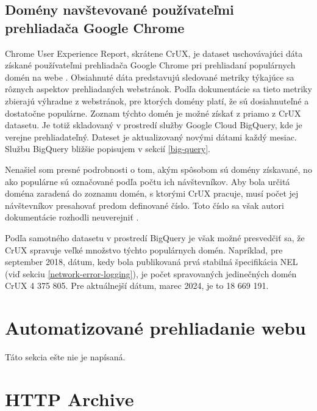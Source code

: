 \subsection{Domény navštevované používateľmi prehliadača Google Chrome}
\label{chrome-user-experience-report}

Chrome User Experience Report, skrátene CrUX, je dataset uschovávajúci dáta získané používateľmi prehliadača Google Chrome pri prehliadaní populárnych domén na webe \cite{chrome-crux}.
Obsiahnuté dáta predstavujú sledované metriky týkajúce sa rôznych aspektov prehliadaných webstránok.
Podľa dokumentácie sa tieto metriky zbierajú výhradne z webstránok, pre ktorých domény platí, že sú dosiahnuteľné a dostatočne populárne.
Zoznam týchto domén je možné získať z priamo z CrUX datasetu.
Je totiž skladovaný v prostredí služby Google Cloud BigQuery, kde je verejne prehliadateľný. 
Dateset je aktualizovaný novými dátami každý mesiac.
Službu BigQuery bližšie popisujem v sekcií \ref{big-query}.

Nenašiel som presné podrobnosti o tom, akým spôsobom sú domény získavané, no ako populárne sú označované podľa počtu ich návštevníkov.
Aby bola určitá doména zaradená do zoznamu domén, s ktorými CrUX pracuje, musí počet jej návštevníkov presahovať predom definované číslo.
Toto číslo sa však autori dokumentácie rozhodli neuverejniť \cite{chrome-crux-methodology}.

Podľa samotného datasetu v prostredí BigQuery je však možné presvedčiť sa, že CrUX spravuje veľké množstvo týchto populárnych domén.
Napríklad, pre september 2018, dátum, kedy bola publikovaná prvá stabilná špecifikácia NEL (viď sekciu \ref{network-error-logging}), je počet spravovaných jedinečných domén CrUX 4 375 805.
Pre aktuálnejší dátum, marec 2024, je to 18 669 191.



\section{Automatizované prehliadanie webu}
\label{selenium}

Táto sekcia ešte nie je napísaná.


\section{HTTP Archive}
\label{httparchive}

